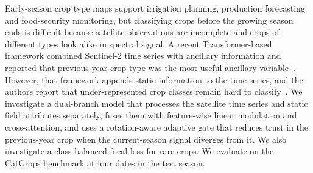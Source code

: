Early-season crop type maps support irrigation planning, production forecasting and food-security monitoring, but classifying crops before the growing season ends is difficult because satellite observations are incomplete and crops of different types look alike in spectral signal. A recent Transformer-based framework combined Sentinel-2 time series with ancillary information and reported that previous-year crop type was the most useful ancillary variable~\cite{genemola2026}. However, that framework appends static information to the time series, and the authors report that under-represented crop classes remain hard to classify~\cite{genemola2026}. We investigate a dual-branch model that processes the satellite time series and static field attributes separately, fuses them with feature-wise linear modulation and cross-attention, and uses a rotation-aware adaptive gate that reduces trust in the previous-year crop when the current-season signal diverges from it. We also investigate a class-balanced focal loss for rare crops. We evaluate on the CatCrops benchmark at four dates in the test season. 
